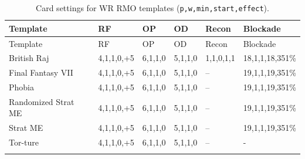 \scriptsize
\begin{longtable}{|p{2.8cm}|p{1.5cm}|p{1cm}|p{1cm}|p{1cm}|p{2cm}|}
\hline
\rowcolor{Baby_Blue}
Template & RF & OP & OD & Recon & Blockade \\ \hline\hline
\endfirsthead
\hline
\rowcolor{Baby_Blue}
Template & RF & OP & OD & Recon & Blockade \\ \hline\hline
\endhead
British Raj            & 4,1,1,0,+5  & 6,1,1,0 & 5,1,1,0 & 1,1,0,1,1   & 18,1,1,18,351\% \\ \hline
Final Fantasy VII      & 4,1,1,0,+5  & 6,1,1,0 & 5,1,1,0 & –   & 19,1,1,19,351\% \\ \hline
Phobia                 & 4,1,1,0,+5  & 6,1,1,0 & 5,1,1,0 & –   & 19,1,1,19,351\% \\ \hline
Randomized Strat ME    & 4,1,1,0,+5  & 6,1,1,0 & 5,1,1,0 & –   & 19,1,1,19,351\% \\ \hline
Strat ME               & 4,1,1,0,+5  & 6,1,1,0 & 5,1,1,0 & –   & 19,1,1,19,351\% \\ \hline
Tor-ture               & 4,1,1,0,+5  & 6,1,1,0 & 5,1,1,0 & –   & -  \\ \hline
\caption{Card settings for WR RMO templates (\texttt{p,w,min,start,effect}).}
\label{table:wr_rmo_cards_trimmed}
\end{longtable}
\normalsize

